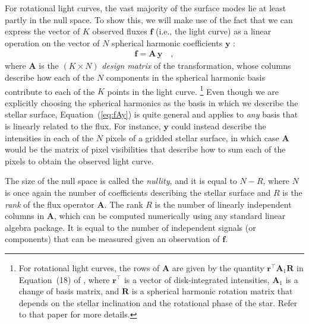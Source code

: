 \documentclass[modern]{aastex62}
\newcommand{\dfm}[1]{{\color{blue}#1}}
\begin{document}
For rotational light curves,
the vast majority of the surface modes lie at least partly in the null
space. To show this, we will make use of the fact that we can express
the vector of $K$ observed fluxes $\mathbf{f}$ (i.e., the light curve)
as a linear operation on the vector of $N$
spherical harmonic coefficients $\mathbf{y}$ \citep{Luger2019}:
%
\begin{align}
    \label{eq:fAy}
    \mathbf{f} = \mathbf{A} \, \mathbf{y}
    \quad,
\end{align}
%
where $\mathbf{A}$ is the $(K \times N)$ \emph{design matrix} of the transformation, whose columns
describe how each of the $N$ components in the spherical harmonic basis contribute
to each of the $K$ points in the light curve.%
\footnote{%
    For rotational light curves, the rows of $\mathbf{A}$ are given by the
    quantity $\mathbf{r}^\top \mathbf{A}_1 \mathbf{R}$ in Equation~(18) of
    \citet{Luger2019}, where $\mathbf{r}^\top$ is a vector of disk-integrated
    intensities, $\mathbf{A}_1$ is a change of basis matrix, and $\mathbf{R}$
    is a spherical harmonic rotation matrix that depends on the stellar inclination
    and the rotational phase of the star. Refer to that paper for more details.
}
%
Even though we are explicitly choosing the spherical harmonics as the basis in which
we describe the stellar surface, Equation~(\ref{eq:fAy}) is quite general and applies to
\emph{any} basis that is linearly related to the flux. For instance, $\mathbf{y}$
could instead describe the intensities in each of the $N$ pixels of a gridded stellar
surface, in which case $\mathbf{A}$ would be the matrix of pixel visibilities that describe
how to sum each of the pixels to obtain the observed light curve.

The size of the null space is called the \emph{nullity}, and it is equal to
$N - R$, where $N$ is once again the number of coefficients describing the
stellar surface and $R$ is the \emph{rank} of the flux operator $\mathbf{A}$.
The rank $R$ is the number of linearly independent columns in $\mathbf{A}$, which
can be computed \dfm{numerically using any standard} linear algebra package. It is equal
to the number of independent signals (or components) that can be measured given
an observation of $\mathbf{f}$.
\end{document}
